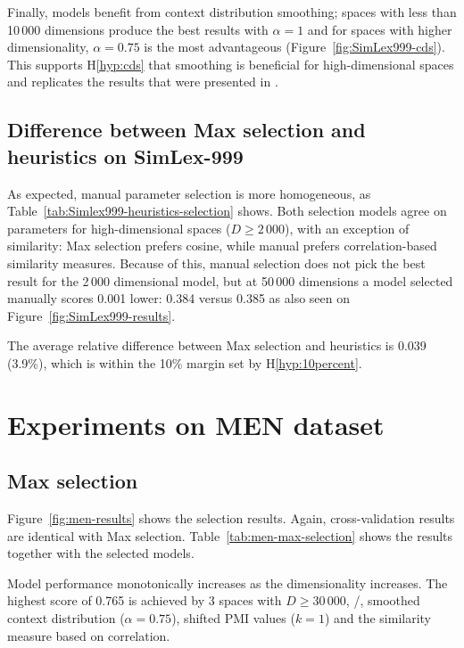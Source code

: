 
Finally, models benefit from context distribution smoothing; spaces with less than 10\,000 dimensions produce the best results with $\alpha = 1$ and for spaces with higher dimensionality, $\alpha = 0.75$ is the most advantageous (Figure~\ref{fig:SimLex999-cds}). This supports H\ref{hyp:cds} that smoothing is beneficial for high-dimensional spaces and replicates the results that were presented in .

\subsection{Difference between Max selection and heuristics on SimLex-999}

As expected, manual parameter selection is more homogeneous, as Table~\ref{tab:Simlex999-heuristics-selection} shows. Both selection models agree on parameters for high-dimensional spaces ($D \geq 2\,000$), with an exception of similarity: Max selection prefers cosine, while manual prefers correlation-based similarity measures. Because of this, manual selection does not pick the best result for the 2\,000 dimensional model, but at 50\,000 dimensions a model selected manually scores 0.001 lower: 0.384 versus 0.385 as also seen on Figure~\ref{fig:SimLex999-results}.

The average relative difference between Max selection and heuristics is 0.039 (3.9\%), which is within the 10\% margin set by H\ref{hyp:10percent}.


\section{Experiments on MEN dataset}
\label{sec:men}

\subsection{Max selection}
\label{sec:max-selection-men}



Figure~\ref{fig:men-results} shows the selection results. Again, cross-validation results are identical with Max selection. Table~\ref{tab:men-max-selection} shows the results together with the selected models.



Model performance monotonically increases as the dimensionality increases. The highest score of 0.765 is achieved by 3 spaces with $D \geq 30\,000$, \logNSCPMI/, smoothed context distribution ($\alpha = 0.75$), shifted PMI values ($k = 1$) and the similarity measure based on correlation.


